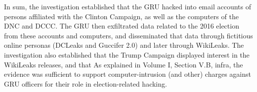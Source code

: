 In sum, the investigation established that the GRU hacked into email accounts of persons affiliated with the Clinton Campaign, as well as the computers of the DNC and DCCC.
The GRU then exfiltrated data related to the 2016 election from these accounts and computers, and disseminated that data through fictitious online personas (DCLeaks and Guccifer 2.0) and later through WikiLeaks.
The investigation also established that the Trump Campaign displayed interest in the WikiLeaks releases, and that 
As explained in Volume I, Section V.B, infra, the evidence was sufficient to support computer-intrusion (and other) charges against GRU officers for their role in election-related hacking.
